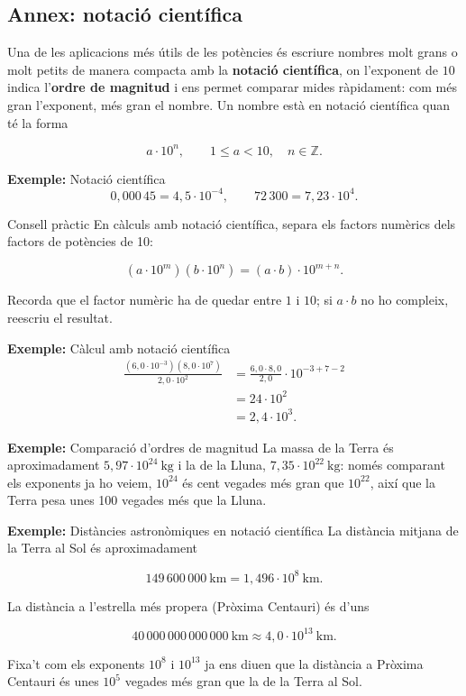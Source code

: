 \subsection{Annex: notació científica}

Una de les aplicacions més útils de les potències és escriure nombres molt grans o molt petits de manera compacta amb la \textbf{notació científica}, on l'exponent de $10$ indica l'\textbf{ordre de magnitud} i ens permet comparar mides ràpidament: com més gran l'exponent, més gran el nombre. Un nombre està en notació científica quan té la forma

\[
a \cdot 10^n, \qquad 1 \leq a < 10, \quad n \in \mathbb{Z}.
\]

\begin{exemple}{\textbf{Exemple:} Notació científica}
\[
0{,}000\,45 = 4{,}5 \cdot 10^{-4}, \qquad 72\,300 = 7{,}23 \cdot 10^{4}.
\]
\end{exemple}

\begin{nota}{Consell pràctic}
En càlculs amb notació científica, separa els factors numèrics dels factors de potències de 10:

\[
(a\cdot 10^m)(b\cdot 10^n) = (a\cdot b)\cdot 10^{m+n}.
\]

Recorda que el factor numèric ha de quedar entre $1$ i $10$; si $a\cdot b$ no ho compleix, reescriu el resultat.
\end{nota}

\begin{exemple}{\textbf{Exemple:} Càlcul amb notació científica}
\[
\begin{aligned}
\frac{(6{,}0\cdot 10^{-3})(8{,}0\cdot 10^{7})}{2{,}0\cdot 10^{2}}
&=\frac{6{,}0\cdot 8{,}0}{2{,}0}\cdot 10^{-3+7-2} \\
&=24\cdot 10^{2} \\
&=2{,}4\cdot 10^{3}.
\end{aligned}
\]
\end{exemple}

\begin{exemple}{\textbf{Exemple:} Comparació d'ordres de magnitud}
La massa de la Terra és aproximadament $5{,}97 \cdot 10^{24}\ \text{kg}$ i la de la Lluna, $7{,}35 \cdot 10^{22}\ \text{kg}$: només comparant els exponents ja ho veiem, $10^{24}$ és cent vegades més gran que $10^{22}$, així que la Terra pesa unes 100 vegades més que la Lluna.
\end{exemple}

\begin{exemple}{\textbf{Exemple:} Distàncies astronòmiques en notació científica}
La distància mitjana de la Terra al Sol és aproximadament

\[
149\,600\,000\ \text{km} = 1{,}496 \cdot 10^{8}\ \text{km}.
\]

La distància a l'estrella més propera (Pròxima Centauri) és d'uns

\[
40\,000\,000\,000\,000\ \text{km} \approx 4{,}0 \cdot 10^{13}\ \text{km}.
\]

Fixa't com els exponents $10^8$ i $10^{13}$ ja ens diuen que la distància a Pròxima Centauri és unes $10^5$ vegades més gran que la de la Terra al Sol.
\end{exemple}

